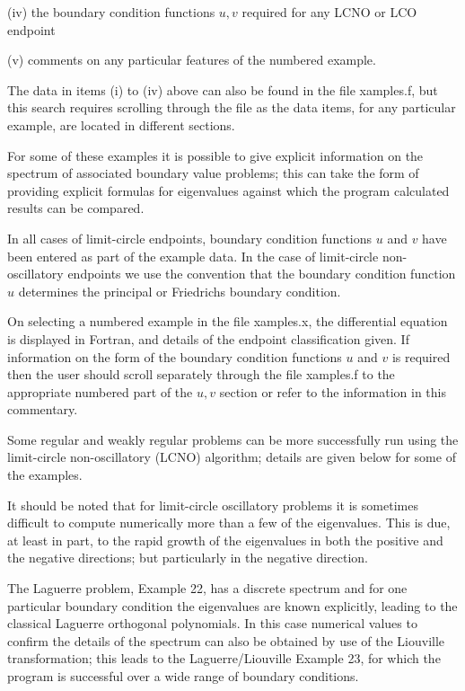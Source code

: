 \documentclass[12pt]{amsart}%
\theoremstyle{plain}
\numberwithin{equation}{section}
\begin{document}
(iv) the boundary condition functions $u,v$ required for any LCNO or LCO endpoint

(v) comments on any particular features of the numbered example.

The data in items (i) to (iv) above can also be found in the file xamples.f,
but this search requires scrolling through the file as the data items, for any
particular example, are located in different sections.

For some of these examples it is possible to give explicit information on the
spectrum of associated boundary value problems; this can take the form of
providing explicit formulas for eigenvalues against which the program
calculated results can be compared.

In all cases of limit-circle endpoints, boundary condition functions $u$ and
$v$ have been entered as part of the example data. In the case of limit-circle
non-oscillatory endpoints we use the convention that the boundary condition
function $u$ determines the principal or Friedrichs boundary condition.

On selecting a numbered example in the file xamples.x, the differential
equation is displayed in Fortran, and details of the endpoint classification
given. If information on the form of the boundary condition functions $u$ and
$v$ is required then the user should scroll separately through the file
xamples.f to the appropriate numbered part of the $u,v$ section or refer to
the information in this commentary.

Some regular and weakly regular problems can be more successfully run using
the limit-circle non-oscillatory (LCNO) algorithm; details are given below for
some of the examples.

It should be noted that for limit-circle oscillatory problems it is sometimes
difficult to compute numerically more than a few of the eigenvalues. This is
due, at least in part, to the rapid growth of the eigenvalues in both the
positive and the negative directions; but particularly in the negative direction.

The Laguerre problem, Example 22, has a discrete spectrum and for one
particular boundary condition the eigenvalues are known explicitly, leading to
the classical Laguerre orthogonal polynomials. In this case numerical values
to confirm the details of the spectrum can also be obtained by use of the
Liouville transformation; this leads to the Laguerre/Liouville Example 23, for
which the program is successful over a wide range of boundary conditions.
\end{document}
